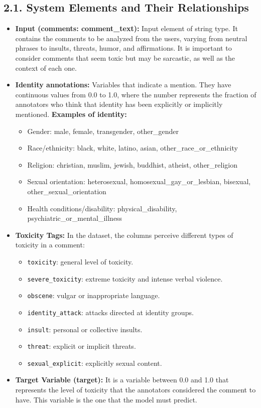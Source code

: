 \documentclass[a4paper,12pt]{article}
\begin{document}
\subsection*{2.1. System Elements and Their Relationships}
\begin{itemize}
\item \textbf{Input (comments: comment\_text):} Input element of string type. It contains the comments to be analyzed from the users, varying from neutral phrases to insults, threats, humor, and affirmations. It is important to consider comments that seem toxic but may be sarcastic, as well as the context of each one.
\item \textbf{Identity annotations:} Variables that indicate a mention. They have continuous values from 0.0 to 1.0, where the number represents the fraction of annotators who think that identity has been explicitly or implicitly mentioned.
\textbf{Examples of identity:}
\begin{itemize}
\item Gender: male, female, transgender, other\_gender
\item Race/ethnicity: black, white, latino, asian, other\_race\_or\_ethnicity
\item Religion: christian, muslim, jewish, buddhist, atheist, other\_religion
\item Sexual orientation: heterosexual, homosexual\_gay\_or\_lesbian, bisexual, other\_sexual\_orientation
\item Health conditions/disability: physical\_disability, psychiatric\_or\_mental\_illness
\end{itemize}
\item \textbf{Toxicity Tags:} In the dataset, the columns perceive different types of toxicity in a comment:
\begin{itemize}
\item \texttt{toxicity}: general level of toxicity.
\item \texttt{severe\_toxicity}: extreme toxicity and intense verbal violence.
\item \texttt{obscene}: vulgar or inappropriate language.
\item \texttt{identity\_attack}: attacks directed at identity groups.
\item \texttt{insult}: personal or collective insults.
\item \texttt{threat}: explicit or implicit threats.
\item \texttt{sexual\_explicit}: explicitly sexual content.
\end{itemize}
\item \textbf{Target Variable (target):} It is a variable between 0.0 and 1.0 that represents the level of toxicity that the annotators considered the comment to have. This variable is the one that the model must predict.
\end{itemize}
\end{document}
